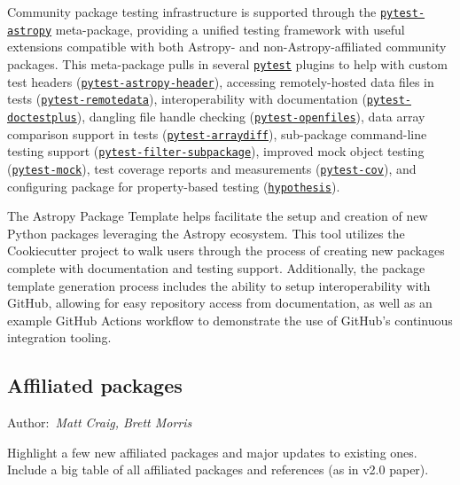 \documentclass[modern]{aastex631}
\newcommand{\secauthor}[1]{{\color{blue}Author:~\textit{#1}}}
\begin{document}
Community package testing infrastructure is supported through the
\href{https://github.com/astropy/pytest-astropy}{\texttt{pytest-astropy}}
meta-package, providing a unified testing framework with useful extensions
compatible with both Astropy- and non-Astropy-affiliated community packages.
This meta-package pulls in several
\href{https://github.com/pytest-dev/pytest}{\texttt{pytest}} plugins to help
with custom test headers
(\href{https://github.com/astropy/pytest-astropy-header}{\texttt{pytest-astropy-header}}),
accessing remotely-hosted data files in tests
(\href{https://github.com/astropy/pytest-remotedata}{\texttt{pytest-remotedata}}),
interoperability with documentation
(\href{https://github.com/astropy/pytest-doctestplus}{\texttt{pytest-doctestplus}}),
dangling file handle checking
(\href{https://github.com/astropy/pytest-openfiles}{\texttt{pytest-openfiles}}),
data array comparison support in tests
(\href{https://github.com/astropy/pytest-arraydiff}{\texttt{pytest-arraydiff}}),
sub-package command-line testing support
(\href{https://github.com/astropy/pytest-filter-subpackage}{\texttt{pytest-filter-subpackage}}),
improved mock object testing
(\href{https://github.com/pytest-dev/pytest-mock}{\texttt{pytest-mock}}), test
coverage reports and measurements
(\href{https://github.com/pytest-dev/pytest-cov}{\texttt{pytest-cov}}), and
configuring package for property-based testing
(\href{https://github.com/HypothesisWorks/hypothesis}{\texttt{hypothesis}}).

The Astropy Package Template helps facilitate the setup and creation of new
Python packages leveraging the Astropy ecosystem. This tool utilizes the
Cookiecutter project to walk users through the process of creating new
packages complete with documentation and testing support. Additionally, the
package template generation process includes the ability to setup
interoperability with GitHub, allowing for easy repository access from
documentation, as well as an example GitHub Actions workflow to demonstrate
the use of GitHub's continuous integration tooling.

\subsection{Affiliated packages}

\secauthor{Matt Craig, Brett Morris}

Highlight a few new affiliated packages and major updates to existing ones.
Include a big table of all affiliated packages and references (as in v2.0
paper).
\end{document}
